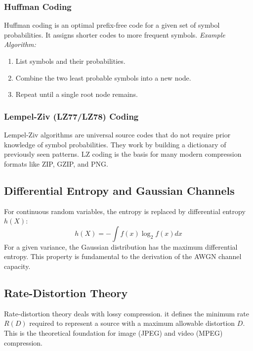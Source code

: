 \subsubsection{Huffman Coding}
Huffman coding is an optimal prefix-free code for a given set of symbol probabilities. It assigns shorter codes to more frequent symbols.
\textit{Example Algorithm:}
\begin{enumerate}
    \item List symbols and their probabilities.
    \item Combine the two least probable symbols into a new node.
    \item Repeat until a single root node remains.
\end{enumerate}

\subsubsection{Lempel-Ziv (LZ77/LZ78) Coding}
Lempel-Ziv algorithms are universal source codes that do not require prior knowledge of symbol probabilities. They work by building a dictionary of previously seen patterns. LZ coding is the basis for many modern compression formats like ZIP, GZIP, and PNG.

\subsection{Differential Entropy and Gaussian Channels}
For continuous random variables, the entropy is replaced by differential entropy $h(X)$:
\begin{equation}
    h(X) = -\int f(x) \log_2 f(x) dx
\end{equation}
For a given variance, the Gaussian distribution has the maximum differential entropy. This property is fundamental to the derivation of the AWGN channel capacity.

\begin{center}
\end{center}

\subsection{Rate-Distortion Theory}
Rate-distortion theory deals with lossy compression. it defines the minimum rate $R(D)$ required to represent a source with a maximum allowable distortion $D$. This is the theoretical foundation for image (JPEG) and video (MPEG) compression.

